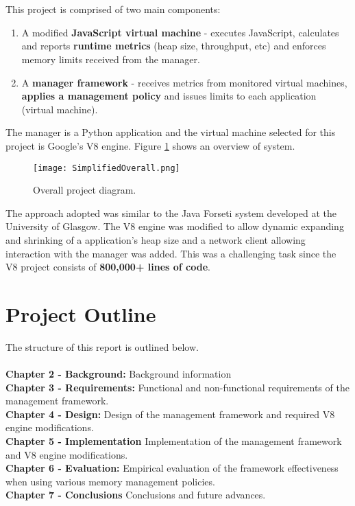 \documentclass{l4proj}
\begin{document}
\\\\
This project is comprised of two main components:
\begin{enumerate}
\item A modified \textbf{JavaScript virtual machine} - executes JavaScript, calculates and reports \textbf{runtime metrics} (heap size, throughput, etc) and enforces memory limits received from the manager.
\item A \textbf{manager framework} - receives metrics from monitored virtual machines, \textbf{applies a management policy} and issues limits to each application (virtual machine).
\end{enumerate}

The manager is a Python application and the virtual machine selected for this project is Google's V8 engine. Figure \ref{overviewfig} shows an overview of system.
\begin{figure}[!ht]
  \centering
    \texttt{[image: SimplifiedOverall.png]}
    \caption{Overall project diagram.}
    \label{overviewfig}
\end{figure}

The approach adopted was similar to the Java Forseti system developed at the University of Glasgow\cite{forseti}. The V8 engine was modified to allow dynamic expanding and shrinking of a application's heap size and a network client allowing interaction with the manager was added. This was a challenging task since the V8 project consists of \textbf{800,000+ lines of code}.

\section{Project Outline}

The structure of this report is outlined below.\\\\
\textbf{Chapter 2 - Background:}
Background information\\
\textbf{Chapter 3 - Requirements:}
Functional and non-functional requirements of the management framework.\\
\textbf{Chapter 4 - Design:}
Design of the management framework and required V8 engine modifications.\\
\textbf{Chapter 5 - Implementation}
Implementation of the management framework and V8 engine modifications.\\
\textbf{Chapter 6 - Evaluation:}
Empirical evaluation of the framework effectiveness when using various memory management policies.\\
\textbf{Chapter 7 - Conclusions}
Conclusions and future advances.%
\end{document}
